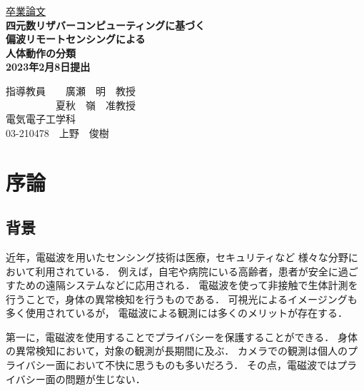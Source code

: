 \documentclass[uplatex,a4paper,12pt]{jsarticle}
\begin{document}
\begin{center}
\vspace*{3cm} \underline{\HUGE 卒業論文 }\\
\vspace{1cm}
\fontsize{23truept}{24truept}\selectfont
\bf{四元数リザバーコンピューティングに基づく\\ \vspace{5mm}
偏波リモートセンシングによる\\ \vspace{5mm}
人体動作の分類\\}
\vspace{1cm}
\huge 2023年2月8日提出 \\
\vspace{1cm}
\end{center}
\begin{minipage}{0.4\hsize}
\hspace{1zw}
\end{minipage}
\begin{center}
\begin{minipage}{0.7\hsize}
{\huge 指導教員　　廣瀬　明　教授\\　　　　\ \ 夏秋　嶺　准教授}
\vspace{1cm}\\
\centering
{\huge 電気電子工学科\\}
{\huge 03-210478　上野　俊樹}
\end{minipage}
\end{center}


\newpage
\tableofcontents

\newpage 

\section{序論}
\subsection{背景}
近年，電磁波を用いたセンシング技術は医療，セキュリティなど
様々な分野において利用されている\cite{human_motion}．
例えば，自宅や病院にいる高齢者，患者が安全に過ごすための遠隔システムなどに応用される．
電磁波を使って非接触で生体計測を行うことで，身体の異常検知を行うものである．
可視光によるイメージングも多く使用されているが，
電磁波による観測には多くのメリットが存在する．

第一に，電磁波を使用することでプライバシーを保護することができる．
身体の異常検知において，対象の観測が長期間に及ぶ．
カメラでの観測は個人のプライバシー面において不快に思うものも多いだろう．
その点，電磁波ではプライバシー面の問題が生じない．
\end{document}
